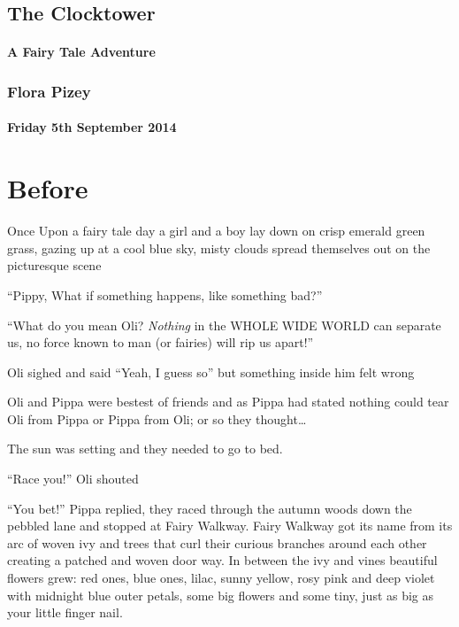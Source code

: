 \section{The Clocktower}\label{the-clocktower}

\subsubsection{A Fairy Tale Adventure}\label{a-fairy-tale-adventure}

\subsection{Flora Pizey}\label{flora-pizey}

\subsubsection{Friday 5th September
2014}\label{friday-5th-september-2014}

\chapter{Before}

\sffamily \LARGE
Once Upon a fairy tale day a girl and a boy lay down on crisp emerald
green grass, gazing up at a cool blue sky, misty clouds spread
themselves out on the picturesque scene

``Pippy, What if something happens, like something bad?''

``What do you mean Oli? \emph{Nothing} in the WHOLE WIDE WORLD can
separate us, no force known to man (or fairies) will rip us apart!''

Oli sighed and said ``Yeah, I guess so'' but something inside him felt
wrong

Oli and Pippa were bestest of friends and as Pippa had stated nothing
could tear Oli from Pippa or Pippa from Oli; or so they thought\ldots{}

The sun was setting and they needed to go to bed.

``Race you!'' Oli shouted

``You bet!'' Pippa replied, they raced through the autumn woods down the
pebbled lane and stopped at Fairy Walkway. Fairy Walkway got its name
from its arc of woven ivy and trees that curl their curious branches
around each other creating a patched and woven door way. In between the
ivy and vines beautiful flowers grew: red ones, blue ones, lilac, sunny
yellow, rosy pink and deep violet with midnight blue outer petals, some
big flowers and some tiny, just as big as your little finger nail.

